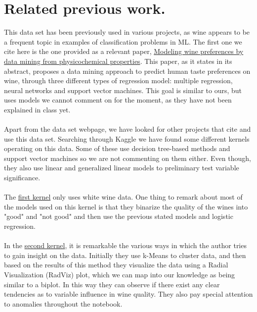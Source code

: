 \documentclass[10pt]{article}
\begin{document}
\section{Related previous work.}
This data set has been previously used in various projects, as wine appears to be a frequent topic in examples of classification problems in ML. The first one we cite here is the one provided as a relevant paper, \href{https://www.sciencedirect.com/science/article/pii/S0167923609001377?via\%3Dihub}{Modeling wine preferences by data mining from physicochemical properties}. This paper, as it states in its abstract, proposes a data mining approach to predict human taste preferences on wine, through three different types of regression model: multiple regression, neural networks and support vector machines. This goal is similar to ours, but uses models we cannot comment on for the moment, as they have not been explained in class yet. \\ \ \\
Apart from the data set webpage, we have looked for other projects that cite and use this data set. Searching through Kaggle we have found some different kernels operating on this data. Some of these use decision tree-based methods and support vector machines so we are not commenting on them either. Even though, they also use linear and generalized linear models to preliminary test variable significance. \\ \ \\
The \href{https://www.kaggle.com/indra90/predicting-white-wine-quality}{first kernel} only uses white wine data. One thing to remark about most of the models used on this kernel is that they binarize the quality of the wines into "good" and "not good" and then use the previous stated models and logistic regression. \\ \ \\
In the \href{https://www.kaggle.com/conradws/how-good-is-this-wine-m-l-for-quality-control}{second kernel}, it is remarkable the various ways in which the author tries to gain insight on the data. Initially they use k-Means to cluster data, and then based on the results of this method they visualize the data using a Radial Visualization (RadViz) plot, which we can map into our knowledge as being similar to a biplot. In this way they can observe if there exist any clear tendencies as to variable influence in wine quality. They also pay special attention to anomalies throughout the notebook. \\ \ \\
\end{document}
